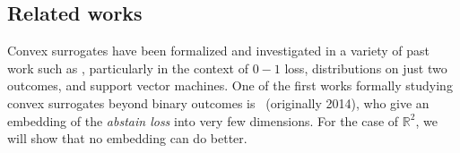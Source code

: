 \documentclass[anon,12pt]{colt2019}
\newcommand{\Comments}{1}
\newcommand{\mytodo}[2]{\ifnum\Comments=1%
  \todo[linecolor=#1!80!black,backgroundcolor=#1,bordercolor=#1!80!black]{#2}\fi}
\newcommand{\jessiet}[1]{\mytodo{purple!20!white}{JF: #1}}
\newcommand{\reals}{\mathbb{R}}
\newcommand{\eliccvx}{\mathrm{elic}_\mathrm{cvx}}
\newcommand{\Y}{\mathcal{Y}}
\begin{document}
\subsection{Related works}
Convex surrogates have been formalized and investigated in a variety of past work such as \citet{crammer2001algorithmic,bartlett2006convexity,bartlett2008classification}, particularly in the context of $0-1$ loss, distributions on just two outcomes, and support vector machines.
%
%
%
%
  One of the first works formally studying convex surrogates beyond binary outcomes is~\cite{ramaswamy2018consistent} (originally 2014), who give an embedding of the \emph{abstain loss} into very few dimensions.
For the case of $\reals^2$, we will show that no embedding can do better.
\end{document}
